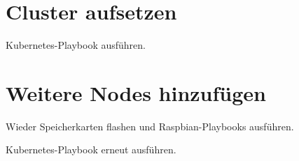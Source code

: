 \section{Cluster aufsetzen}

Kubernetes-Playbook ausführen.

\section{Weitere Nodes hinzufügen}

Wieder Speicherkarten flashen und Raspbian-Playbooks ausführen.

Kubernetes-Playbook erneut ausführen.